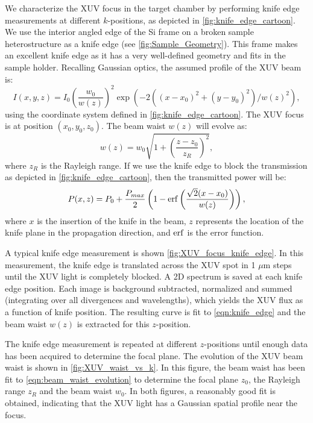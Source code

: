 We characterize the XUV focus in the target chamber by performing knife edge measurements at different $k$-positions, as depicted in \cref{fig:knife_edge_cartoon}. We use the interior angled edge of the Si frame on a broken sample heterostructure as a knife edge (see \cref{fig:Sample_Geometry}). This frame makes an excellent knife edge as it has a very well-defined geometry and fits in the sample holder. Recalling Gaussian optics, the assumed profile of the XUV beam is:
\begin{equation}
I(x,y,z) = I_0 \left( \frac{w_0}{w(z)} \right)^2 \exp \left( - 2 ((x-x_0)^2 + (y-y_0)^2) /  w(z)^2 \right),
\end{equation}
using the coordinate system defined in \cref{fig:knife_edge_cartoon}. The XUV focus is at position $(x_0,y_0,z_0)$. The beam waist $w(z)$ will evolve as:
\begin{equation}
w(z) = w_0 \sqrt{ 1 + \left( \frac{z-z_0}{z_R} \right)^2 },
\label{eqn:beam_waist_evolution}
\end{equation}
where $z_R$ is the Rayleigh range. If we use the knife edge to block the transmission as depicted in \cref{fig:knife_edge_cartoon}, then the transmitted power will be:
\begin{equation}
P(x, z) = P_0 + \frac{P_{max}}{2} \left( 1 - \erf \left( \frac{\sqrt{2}(x-x_0)}{w(z)} \right) \right),
\label{eqn:knife_edge}
\end{equation}
where $x$ is the insertion of the knife in the beam, $z$ represents the location of the knife plane in the propagation direction, and $\erf$ is the error function.

A typical knife edge measurement is shown \cref{fig:XUV_focus_knife_edge}. In this measurement, the knife edge is translated across the XUV spot in 1 $\mu$m steps until the XUV light is completely blocked. A 2D spectrum is saved at each knife edge position. Each image is background subtracted, normalized and summed (integrating over all divergences and wavelengths), which yields the XUV flux as a function of knife position. The resulting curve is fit to \cref{eqn:knife_edge} and the beam waist $w(z)$ is extracted for this $z$-position.

The knife edge measurement is repeated at different $z$-positions until enough data has been acquired to determine the focal plane. The evolution of the XUV beam waist is shown in \cref{fig:XUV_waist_vs_k}. In this figure, the beam waist has been fit to \cref{eqn:beam_waist_evolution} to determine the focal plane $z_0$, the Rayleigh range $z_R$ and the beam waist $w_0$. In both figures, a reasonably good fit is obtained, indicating that the XUV light has a Gaussian spatial profile near the focus.


